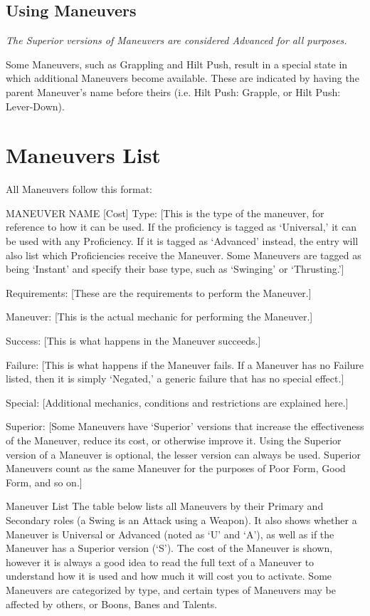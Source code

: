 \documentclass[oneside,11pt,english]{book}
\begin{document}
\subsection{Using Maneuvers}
\emph{The Superior versions of Maneuvers are considered Advanced for all purposes.}

Some Maneuvers, such as Grappling and Hilt Push, result in a special state in which additional Maneuvers become available. These are indicated by having the parent Maneuver’s name before theirs (i.e. Hilt Push: Grapple, or Hilt Push: Lever-Down).

\section{\label{sec:Maneuvers}Maneuvers List}

All Maneuvers follow this format:


MANEUVER NAME [Cost]
Type: [This is the type of the maneuver, for reference to how it can be used. If the proficiency is tagged as ‘Universal,’ it can be used with any Proficiency. If it is tagged as ‘Advanced’ instead, the entry will also list which Proficiencies receive the Maneuver. Some Maneuvers are tagged as being ‘Instant’ and specify their base type, such as ‘Swinging’ or ‘Thrusting.’]


Requirements: [These are the requirements to perform the Maneuver.]


Maneuver: [This is the actual mechanic for performing the Maneuver.]


Success: [This is what happens in the Maneuver succeeds.]


Failure: [This is what happens if the Maneuver fails. If a Maneuver has no Failure listed, then it is simply ‘Negated,’ a generic failure that has no special effect.]


Special: [Additional mechanics, conditions and restrictions are explained here.]


Superior: [Some Maneuvers have ‘Superior’ versions that increase the effectiveness of the Maneuver, reduce its cost, or otherwise improve it. Using the Superior version of a Maneuver is optional, the lesser version can always be used. Superior Maneuvers count as the same Maneuver for the purposes of Poor Form, Good Form, and so on.]


Maneuver List 
The table below lists all Maneuvers by their Primary and Secondary roles (a Swing is an Attack using a 
Weapon). It also shows whether a Maneuver is Universal or Advanced (noted as ‘U’ and ‘A’), as well as 
if the Maneuver has a Superior version (‘S’). The cost of the Maneuver is shown, however it is always a 
good idea to read the full text of a Maneuver to understand how it is used and how much it will cost you 
to activate. Some Maneuvers are categorized by type, and certain types of Maneuvers may be affected by 
others, or Boons, Banes and Talents. 
\end{document}
